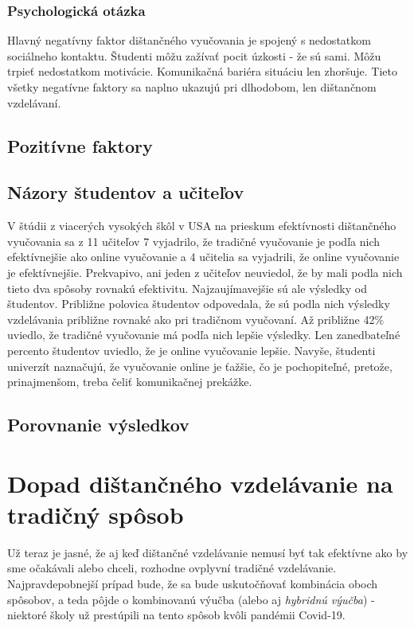 \documentclass[10pt,twoside,slovak,a4paper]{article}
\begin{document}
\subsubsection{Psychologická otázka}
Hlavný negatívny faktor dištančného vyučovania je spojený s nedostatkom sociálneho kontaktu. Študenti môžu zažívať pocit úzkosti - že sú sami. Môžu trpieť nedostatkom motivácie. Komunikačná bariéra situáciu len zhoršuje. Tieto všetky negatívne faktory sa naplno ukazujú pri dlhodobom, len dištančnom vzdelávaní.

\subsection{Pozitívne faktory}

\subsection{Názory študentov a učiteľov} \label{nazory}
V štúdii z viacerých vysokých škôl v USA na prieskum efektívnosti dištančného vyučovania sa z 11 učiteľov 7 vyjadrilo, že tradičné vyučovanie je podľa nich efektívnejšie ako online vyučovanie a 4 učitelia sa vyjadrili, že online vyučovanie je efektívnejšie. Prekvapivo, ani jeden z učiteľov neuviedol, že by mali podla nich tieto dva spôsoby rovnakú efektivitu. Najzaujímavejšie sú ale výsledky od študentov. Približne polovica študentov odpovedala, že sú podla nich výsledky vzdelávania približne rovnaké ako pri tradičnom vyučovaní. Až približne 42\% uviedlo, že tradičné vyučovanie má podľa nich lepšie výsledky. Len zanedbateľné percento študentov uviedlo, že je online vyučovanie lepšie. Navyše, študenti univerzít naznačujú, že vyučovanie online je ťažšie, čo je pochopiteľné, pretože, prinajmenšom, treba čeliť komunikačnej prekážke\cite{Warren:Effectiveness}.

\subsection{Porovnanie výsledkov}


\section{Dopad dištančného vzdelávanie na tradičný spôsob} \label{dopad}
Už teraz je jasné, že aj keď dištančné vzdelávanie nemusí byť tak efektívne ako by sme očakávali alebo chceli, rozhodne ovplyvní tradičné vzdelávanie. Najpravdepobnejší prípad bude, že sa bude uskutočňovať kombinácia oboch spôsobov, a teda pôjde o kombinovanú výučba (alebo aj \textit{hybridnú výučba}) - niektoré školy už prestúpili na tento spôsob kvôli pandémii Covid-19\cite{Zimmerman:Experiment}.
\end{document}
